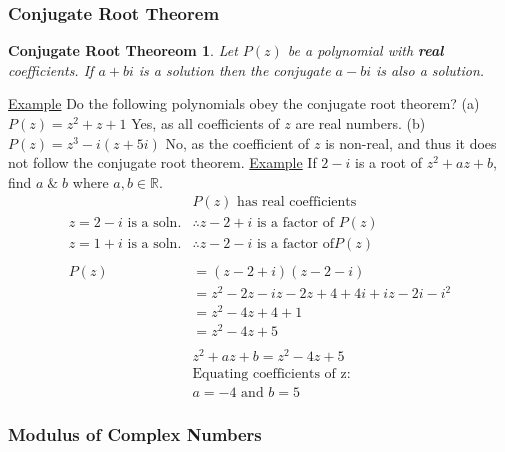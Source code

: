 \documentclass[a4paper]{article}
\begin{document}
			\subsubsection{Conjugate Root Theorem}
				\newtheorem*{conjugateRootTheorem}{Conjugate Root Theoreom}
				\begin{conjugateRootTheorem}
					Let $P(z)$ be a polynomial with \textbf{real} coefficients. If $a+bi$ is a solution then the conjugate $a-bi$ is also a solution.
				\end{conjugateRootTheorem}
				\noindent\underline{Example}\newline
				Do the following polynomials obey the conjugate root theorem?\newline
				(a) $P(z)=z^2+z+1$\newline
				Yes, as all coefficients of $z$ are real numbers.\newline\newline
				(b) $P(z)=z^3-i(z+5i)$\newline
				No, as the coefficient of $z$ is non-real, and thus it does not follow the conjugate root theorem.
				\newpage
				\noindent\underline{Example}\newline
				If $2-i$ is a root of $z^2+az+b$, find $a\;\&\;b$ where $a,b\in\mathbb{R}$.\newline
				\begin{align*}
					&P(z)\text{ has real coefficients} \\
					z=2-i\text{ is a soln.} &\therefore z-2+i\text{ is a factor of }P(z) \\
					z=1+i\text{ is a soln.} &\therefore z-2-i\text{ is a factor of}P(z) \\
					\\
					P(z)&=(z-2+i)(z-2-i) \\
					&=z^2-2z-iz-2z+4+4i+iz-2i-i^2 \\
					&=z^2-4z+4+1 \\
					&=z^2-4z+5 \\
					\\
					&z^2+az+b=z^2-4z+5\\
					&\text{Equating coefficients of z:}\\
					&a=-4\text{ and }b=5
				\end{align*}
			\subsubsection{Modulus of Complex Numbers}
\end{document}
